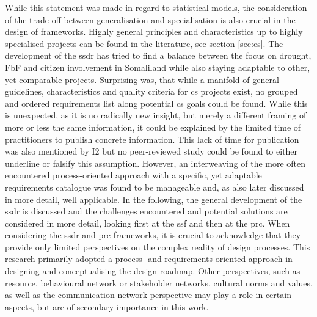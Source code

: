 While this statement was made in regard to statistical models, the consideration of the trade-off between generalisation and specialisation is also crucial in the design of frameworks. Highly general principles and characteristics up to highly specialised projects can be found in the literature, see section \ref{sec:cs}. The development of the \acrshort{ssdr} has tried to find a balance between the focus on drought, FbF and citizen involvement in Somaliland while also staying adaptable to other, yet comparable projects.\newline
Surprising was, that while a manifold of general guidelines, characteristics and quality criteria for \acrlong{cs} projects exist, no grouped and ordered requirements list along potential \acrshort{cs} goals could be found. While this is unexpected, as it is no radically new insight, but merely a different framing of more or less the same information, it could be explained by the limited time of practitioners to publish concrete information. This lack of time for publication was also mentioned by I2 but no peer-reviewed study could be found to either underline or falsify this assumption. However, an interweaving of the more often encountered process-oriented approach with a specific, yet adaptable requirements catalogue was found to be manageable and, as also later discussed in more detail, well applicable.\newline
In the following, the general development of the \acrshort{ssdr} is discussed and the challenges encountered and potential solutions are considered in more detail, looking first at the \acrshort{ssf} and then at the \acrshort{prc}. When considering the \acrshort{ssdr} and \acrshort{prc} frameworks, it is crucial to acknowledge that they provide only limited perspectives on the complex reality of design processes. This research primarily adopted a process- and requirements-oriented approach in designing and conceptualising the design roadmap. Other perspectives, such as resource, behavioural network or stakeholder networks, cultural norms and values, as well as the communication network perspective may play a role in certain aspects, but are of secondary importance in this work.\newline
